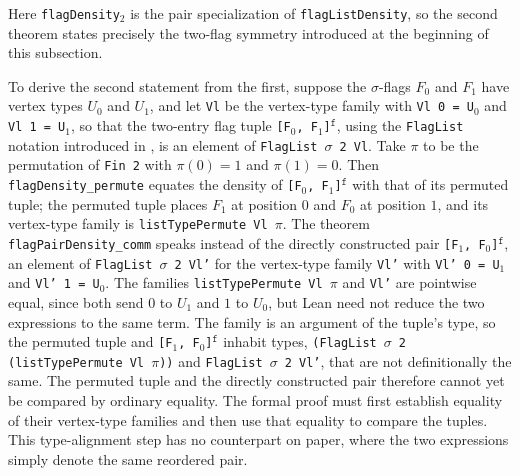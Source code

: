 \documentclass{article}
\newcommand{\lean}[1]{\texttt{#1}}
\begin{document}
Here \lean{flagDensity}$_2$ is the pair specialization of
\lean{flagListDensity}, so the second theorem states precisely the two-flag
symmetry introduced at the beginning of this subsection.

To derive the second statement from the first, suppose the $\sigma$-flags
$F_0$ and $F_1$ have vertex types $U_0$ and $U_1$, and let \lean{Vl} be the
vertex-type family with
\lean{Vl 0 = U}$_0$ and \lean{Vl 1 = U}$_1$, so that the two-entry flag tuple
\lean{[F}$_0$\lean{, F}$_1$\lean{]}$^{\mathtt{f}}$, using the
\lean{FlagList} notation introduced in
, is an element of
\lean{FlagList}~$\sigma$~\lean{2 Vl}.  Take $\pi$ to be the permutation of
\lean{Fin 2} with $\pi(0)=1$ and $\pi(1)=0$.  Then
\lean{flagDensity\_permute} equates the density of
\lean{[F}$_0$\lean{, F}$_1$\lean{]}$^{\mathtt{f}}$ with that of its permuted
tuple; the permuted tuple places $F_1$ at position $0$ and $F_0$ at
position $1$, and its vertex-type family is
\lean{listTypePermute Vl $\pi$}.  The theorem \lean{flagPairDensity\_comm} speaks instead
of the directly constructed pair
\lean{[F}$_1$\lean{, F}$_0$\lean{]}$^{\mathtt{f}}$, an element of
\lean{FlagList}~$\sigma$~\lean{2 Vl'} for the vertex-type family \lean{Vl'}
with \lean{Vl' 0 = U}$_1$ and \lean{Vl' 1 = U}$_0$.  The families 
\lean{listTypePermute Vl $\pi$} and \lean{Vl'} are pointwise equal, since both send $0$
to $U_1$ and $1$ to $U_0$, but Lean need not reduce the two expressions to
the same term.  The family is an argument of the tuple's type, so the
permuted tuple and \lean{[F}$_1$\lean{, F}$_0$\lean{]}$^{\mathtt{f}}$
inhabit types, \lean{(FlagList}~$\sigma$~\lean{2 (listTypePermute Vl $\pi$))}
and \lean{FlagList}~$\sigma$~\lean{2 Vl'}, that are not definitionally the
same.  The permuted tuple and the directly constructed pair therefore cannot
yet be compared by ordinary equality.  The formal proof must first establish
equality of their vertex-type families and then use that equality to compare
the tuples.  This type-alignment step has no counterpart on paper, where the
two expressions simply denote the same reordered pair.
\end{document}
